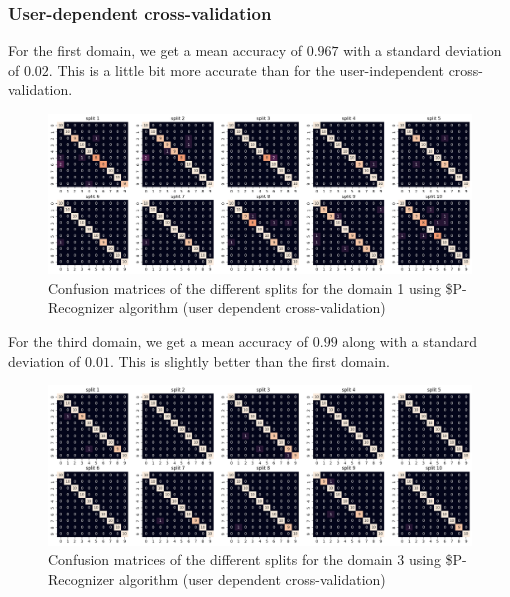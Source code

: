 \subsubsection{User-dependent cross-validation}

For the first domain, we get a mean accuracy of $0.967$ with a standard deviation of $0.02$. This is a little bit more accurate than for the user-independent cross-validation.

\begin{figure}[H]
	\centering
	\includegraphics{figures/pcr/domain01/cm_pcr_d1_udep.png}
	\caption{Confusion matrices of the different splits for the domain 1 using \$P-Recognizer algorithm (user dependent cross-validation)}
	\label{fig:cm-pcr-d1-udep}
\end{figure}

For the third domain, we get a mean accuracy of $0.99$ along with a standard deviation of $0.01$. This is slightly better than the first domain.

\begin{figure}[H]
	\centering
	\includegraphics{figures/pcr/domain03/cm_pcr_d3_udep.png}
	\caption{Confusion matrices of the different splits for the domain 3 using \$P-Recognizer algorithm (user dependent cross-validation)}
	\label{fig:cm-pcr-d3-udep}
\end{figure}
